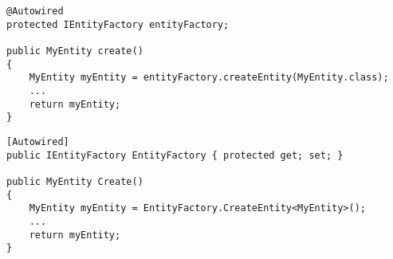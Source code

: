 \begin{lstlisting}[style=Java,caption={Usage example for \type{EntityFactory} (Java)}]
@Autowired
protected IEntityFactory entityFactory;

public MyEntity create()
{
	MyEntity myEntity = entityFactory.createEntity(MyEntity.class);
	...
	return myEntity;
}
\end{lstlisting}
\begin{lstlisting}[style=Csharp,caption={Usage example for \type{EntityFactory} (C\#)}]
[Autowired]
public IEntityFactory EntityFactory { protected get; set; }

public MyEntity Create()
{
	MyEntity myEntity = EntityFactory.CreateEntity<MyEntity>();
	...
	return myEntity;
}
\end{lstlisting}